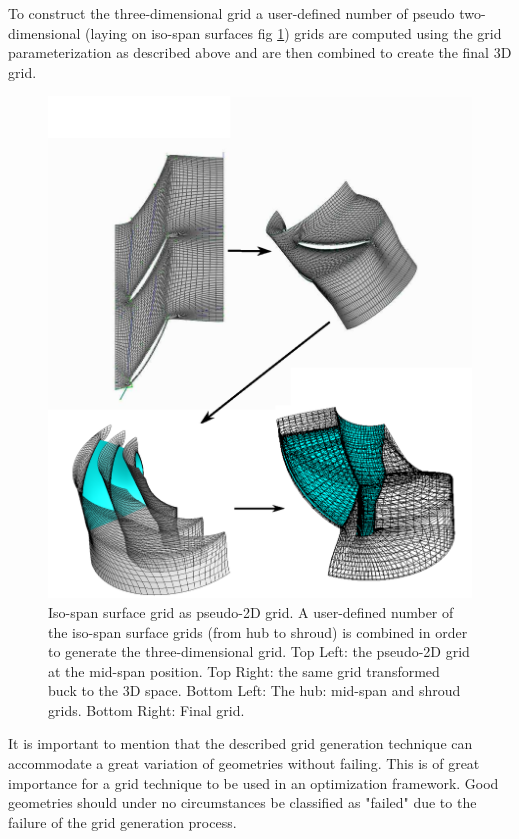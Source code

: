 To construct the three-dimensional grid a user-defined number of pseudo two-dimensional (laying on iso-span surfaces fig \ref{grid4}) grids are computed using the grid parameterization as described above and are then combined to create the final 3D grid.

\begin{figure}[h!]
\centering
\includegraphics[width=140mm]{merid.eps} 
\caption{Iso-span surface grid as pseudo-2D grid. A user-defined number of the iso-span surface grids (from hub to shroud) is combined in order to generate the three-dimensional grid. Top Left: the pseudo-2D grid at the mid-span position. Top Right: the same grid transformed buck to the 3D space. Bottom Left: The hub: mid-span and shroud grids. Bottom Right: Final grid.}
\label{grid4}
\end{figure}

It is important to mention that the described grid generation technique can accommodate a great variation of geometries without failing. This is of great importance for a grid technique to be used in an optimization framework. Good geometries should under no circumstances be classified as "failed" due to the failure of the grid generation process. 

